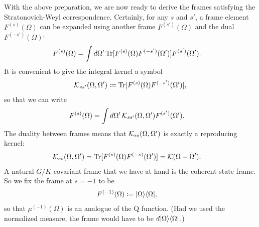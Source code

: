 With the above preparation, we are now ready to derive the frames satisfying the Stratonovich-Weyl correspondence. Certainly, for any $s$ and $s'$, a frame element $F^{(s)} (\Omega)$ can be expanded using another frame $F^{(s')} (\Omega)$ and the dual $F^{(-s')}(\Omega)$:
\begin{align}\label{eq:SW-reconstruction}
	F^{(s)} (\Omega) &= \int d\Omega'\,\Tr [F^{(s)} (\Omega) F^{(-s')} (\Omega')] F^{(s')} (\Omega').
\end{align}
It is convenient to give the integral kernel a symbol
\begin{align}
	\mathcal{K}_{ss'}(\Omega,\Omega') \coloneqq \mathrm{Tr} [F^{(s)} (\Omega) F^{(-s')} (\Omega')],
\end{align}
so that we can write
\begin{align}
	F^{(s)} (\Omega) &= \int d\Omega'\,\mathcal{K}_{ss'}(\Omega,\Omega') F^{(s')} (\Omega').
\end{align} 
The duality between frames means that $\mathcal{K}_{ss}(\Omega,\Omega')$ is exactly a reproducing kernel:
\begin{align}\label{eq:SW-duality}
	\rker{ss}(\Omega,\Omega') &= \Tr [F^{(s)} (\Omega)F^{(-s)}(\Omega')] =  \mathcal{K}(\Omega - \Omega').
\end{align}
A natural $G/K$-covariant frame that we have at hand is the coherent-state frame. So we fix the frame at $s=-1$ to be
\begin{align}
F^{(-1)}(\Omega) &\coloneqq {\left\vert{\Omega}\right\rangle}{\left\langle{\Omega}\right\vert},
\end{align}
so that $\mu^{(-1)}(\Omega)$ is an analogue of the Q function. (Had we used the normalized measure, the frame would have to be $d {\left\vert{\Omega}\right\rangle}{\left\langle{\Omega}\right\vert}$.)

